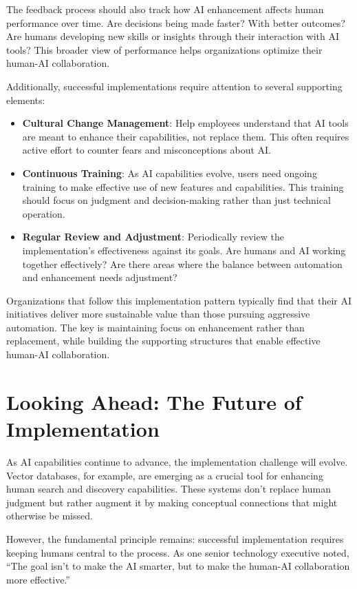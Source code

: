 \documentclass[
  Letterpaper,
]{scrbook}
\begin{document}
The feedback process should also track how AI enhancement affects human
performance over time. Are decisions being made faster? With better
outcomes? Are humans developing new skills or insights through their
interaction with AI tools? This broader view of performance helps
organizations optimize their human-AI collaboration.

Additionally, successful implementations require attention to several
supporting elements:

\begin{itemize}
\item
  \textbf{Cultural Change Management}: Help employees understand that AI
  tools are meant to enhance their capabilities, not replace them. This
  often requires active effort to counter fears and misconceptions about
  AI.
\item
  \textbf{Continuous Training}: As AI capabilities evolve, users need
  ongoing training to make effective use of new features and
  capabilities. This training should focus on judgment and
  decision-making rather than just technical operation.
\item
  \textbf{Regular Review and Adjustment}: Periodically review the
  implementation's effectiveness against its goals. Are humans and AI
  working together effectively? Are there areas where the balance
  between automation and enhancement needs adjustment?
\end{itemize}

Organizations that follow this implementation pattern typically find
that their AI initiatives deliver more sustainable value than those
pursuing aggressive automation. The key is maintaining focus on
enhancement rather than replacement, while building the supporting
structures that enable effective human-AI collaboration.

\section{Looking Ahead: The Future of
Implementation}\label{looking-ahead-the-future-of-implementation}

As AI capabilities continue to advance, the implementation challenge
will evolve. Vector databases, for example, are emerging as a crucial
tool for enhancing human search and discovery capabilities. These
systems don't replace human judgment but rather augment it by making
conceptual connections that might otherwise be missed.

However, the fundamental principle remains: successful implementation
requires keeping humans central to the process. As one senior technology
executive noted, ``The goal isn't to make the AI smarter, but to make
the human-AI collaboration more effective.''
\end{document}
